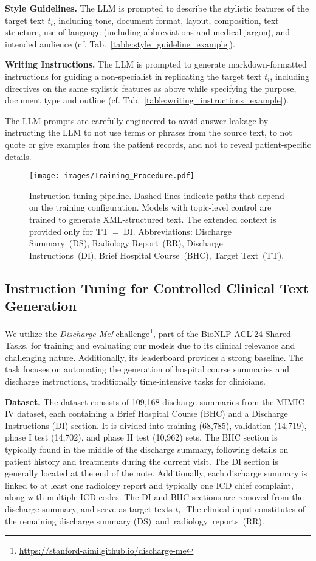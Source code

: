 \textbf{Style Guidelines.} The LLM is prompted to describe the stylistic features of the target text $t_i$, including tone, document format, layout, composition, text structure, use of language (including abbreviations and medical jargon), and intended audience (cf. Tab.~\ref{table:style_guideline_example}).

\textbf{Writing Instructions.} The LLM is prompted to generate markdown-formatted instructions for guiding a non-specialist in replicating the target text $t_i$, including directives on the same stylistic features as above while specifying the purpose, document type and outline (cf. Tab.~\ref{table:writing_instructions_example}).

The LLM prompts are carefully engineered to avoid answer leakage by instructing the LLM to not use terms or phrases from the source text, to not quote or give examples from the patient records, and not to reveal patient-specific details.

\begin{figure}[t!]
  \texttt{[image: images/Training\_Procedure.pdf]}
  \caption{Instruction-tuning pipeline. Dashed lines indicate paths that depend on the training configuration. Models with topic-level control are trained to generate XML-structured text. The extended context is provided only for TT~=~DI. Abbreviations: Discharge Summary~(DS), Radiology Report~(RR), Discharge Instructions~(DI), Brief Hospital Course~(BHC), Target Text~(TT).}
  \label{fig:training-procedure}
\end{figure}

\subsection{Instruction Tuning for Controlled Clinical
Text Generation}
\label{subsec:instruction-tuning-for-controlled-clinical-text-generation}
We utilize the \textit{Discharge Me!} challenge\footnote{\url{https://stanford-aimi.github.io/discharge-me}}, part of the BioNLP ACL'24 Shared Tasks, for training and evaluating our models due to its clinical relevance and challenging nature. Additionally, its leaderboard provides a strong baseline. The task focuses on automating the generation of hospital course summaries and discharge instructions, traditionally time-intensive tasks for clinicians. 

\textbf{Dataset.} The dataset consists of 109,168 discharge summaries from the MIMIC-IV dataset, each containing a Brief Hospital Course (BHC) and a Discharge Instructions (DI) section. It is divided into training (68,785), validation (14,719), phase I test (14,702), and phase II test (10,962) sets. The BHC section is typically found in the middle of the discharge summary, following details on patient history and treatments during the current visit. The DI section is generally located at the end of the note. Additionally, each discharge summary is linked to at least one radiology report and typically one ICD chief complaint, along with multiple ICD codes. The DI and BHC sections are removed from the discharge summary, and serve as target texts $t_i$. The clinical input constitutes of the remaining discharge summary (DS)~and~radiology~reports~(RR).

